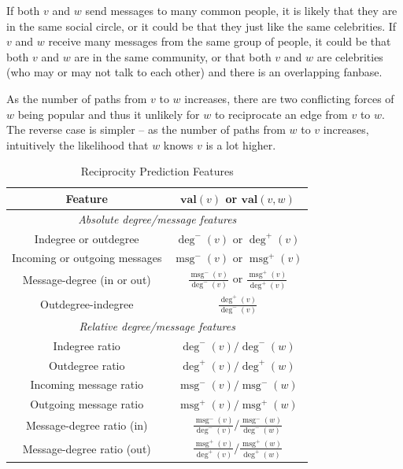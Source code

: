 \documentclass[conference]{IEEEtran}
\begin{document}
If both $v$ and $w$ send messages to many common people, it is likely that they are in the same social circle, or it could be that they just like the same celebrities. If $v$ and $w$ receive many messages from the same group of people, it could be that both $v$ and $w$ are in the same community, or that both $v$ and $w$ are celebrities (who may or may not talk to each other) and there is an overlapping fanbase.

As the number of paths from $v$ to $w$ increases, there are two conflicting forces of $w$ being popular and thus it unlikely for $w$ to reciprocate an edge from $v$ to $w$. The reverse case is simpler -- as the number of paths from $w$ to $v$ increases, intuitively the likelihood that $w$ knows $v$ is a lot higher.

\begin{table}[!t]
\renewcommand{\arraystretch}{1.3}
\caption{Reciprocity Prediction Features}
\label{table_recmethods}
\centering
\begin{tabular}{|c||c|}
\hline
\bf{Feature} & $\mathbf{val}(v)$ or $\mathbf{val}(v,w)$\\
\hline
\multicolumn{2}{|c|}{\emph{Absolute degree/message features}} \\
\hline
Indegree or outdegree & $\deg^-(v)$ or $\deg^+(v)$ \\
Incoming or outgoing messages & $\operatorname{msg}^-(v)$ or $\operatorname{msg}^+(v)$ \\
Message-degree (in or out) & $\frac{\operatorname{msg}^-(v)}{\deg^-(v)}$ or $\frac{\operatorname{msg}^+(v)}{\deg^+(v)}$ \\
Outdegree-indegree & $\frac{\deg^+(v)}{\deg^-(v)}$ \\
\hline
\multicolumn{2}{|c|}{\emph{Relative degree/message features}} \\
\hline
Indegree ratio & $\deg^-(v) / \deg^-(w)$ \\
Outdegree ratio & $\deg^+(v) / \deg^+(w)$ \\
\hline
Incoming message ratio & $\operatorname{msg}^-(v) / \operatorname{msg}^-(w)$ \\
Outgoing message ratio & $\operatorname{msg}^+(v) / \operatorname{msg}^+(w)$ \\
\hline
Message-degree ratio (in) & $\frac{\operatorname{msg}^-(v)}{\deg^-(v)} / \frac{\operatorname{msg}^-(w)}{\deg^-(w)}$ \\
Message-degree ratio (out) & $\frac{\operatorname{msg}^+(v)}{\deg^+(v)} / \frac{\operatorname{msg}^+(w)}{\deg^+(w)}$ \\

\end{tabular}
\end{table}
\end{document}
